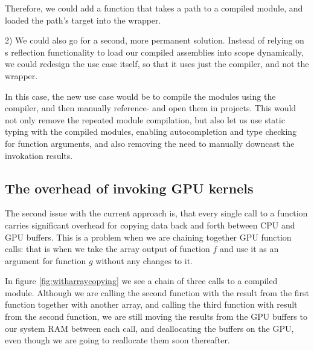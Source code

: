 Therefore, we could add a function that takes a path to a compiled \fshark{}
module, and loaded the path's target into the wrapper.

2) We could also go for a second, more permanent solution. Instead of relying on
\fsharp{}s reflection functionality to load our compiled assemblies into scope
dynamically, we could redesign the \fshark{} use case itself, so that it uses
just the compiler, and not the wrapper.

In this case, the new use case would be to compile the \fshark{} modules using
the \fshark{} compiler, and then manually reference- and open them in \fsharp{} projects.
This would not only remove the repeated module compilation, but also let us use
static typing with the compiled \fshark{} modules, enabling autocompletion and
type checking for function arguments, and also removing the need to manually
downcast the \fshark{} invokation results.

\subsection{The overhead of invoking GPU kernels}
The second issue with the current approach is, that every single call to a
\fshark{} function carries significant overhead for copying data back and forth
between CPU and GPU buffers.
This is a problem when we are chaining together GPU function calls: that is when
we take the array output of function $f$ and use it as an argument for function
$g$ without any changes to it.

In figure \ref{fig:witharraycopying} we see a chain of three calls to a compiled \fshark{} module. 
Although we are calling the second function with the result from the first
function together with another array, and calling the third function with result
from the second function, we are still moving the results from the GPU buffers to our system RAM between each call, and deallocating
the buffers on the GPU, even though we are going to reallocate them soon
thereafter.

